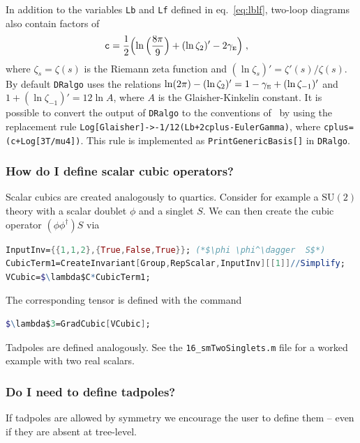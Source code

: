 \documentclass[11pt]{article}
\def\dralgo{{\tt DRalgo}}
\newcommand{\gammaE}{{\gamma_\rmii{E}}}
\newcommand{\rmii}[1]{{\mbox{\tiny\rm{#1}}}}
\begin{document}
In addition to the variables
{\tt Lb} and
{\tt Lf} defined in eq.~\eqref{eq:lblf}, two-loop diagrams also contain factors of
\begin{align}
\label{eq:c}
{\tt c} &=
\frac{1}{2} \Bigl(
  \ln \Big( \frac{8\pi}{9} \Big)
  + (\ln\zeta_{2})'
 - 2 \gammaE \Bigr)
  \;,
\end{align}
where
$\zeta_{s}=\zeta(s)$ is the Riemann zeta function and
$(\ln \zeta_s)'=\zeta'(s)/\zeta(s)$.
By default \dralgo{}  uses the relations
$\ln(2\pi) - (\ln\zeta_{2})' = 1 - \gammaE + (\ln\zeta_{-1})'$
and
$1+(\ln\zeta_{-1})' = 12\ln A$,
where $A$ is the Glaisher-Kinkelin constant.
It is possible to convert the output of \dralgo{} to
the conventions of~\cite{Kajantie:1995dw}
by using the replacement rule
{\tt Log[Glaisher]->-1/12(Lb+2cplus-EulerGamma)},
where
{\tt cplus=(c+Log[3T/mu4])}.
This rule is implemented as
{\tt PrintGenericBasis[]} in \dralgo{}.



%
\subsubsection{How do I define scalar cubic operators?}
Scalar cubics are created analogously to quartics.
Consider for example
a $\mathrm{SU}(2)$ theory with
a scalar doublet $\phi$ and
a singlet $S$.
We can then create the cubic operator
$(\phi \phi^\dagger) S$ via
\begin{lstlisting}[language=Mathematica,mathescape=true]
InputInv={{1,1,2},{True,False,True}}; (*$\phi \phi^\dagger  S$*)
CubicTerm1=CreateInvariant[Group,RepScalar,InputInv][[1]]//Simplify;
VCubic=$\lambda$C*CubicTerm1;
\end{lstlisting}
The corresponding tensor is defined with the command
\begin{lstlisting}[language=Mathematica,mathescape=true]
$\lambda$3=GradCubic[VCubic];
\end{lstlisting}
Tadpoles are defined analogously.
See the
{\tt 16\_smTwoSinglets.m}
file for a worked example with two real scalars.

%
\subsubsection{Do I need to define tadpoles?}
If tadpoles are allowed by symmetry we encourage the user to define them --
even if they are absent at tree-level.
\end{document}
